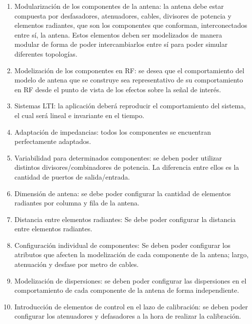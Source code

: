\begin{enumerate}
    \item Modularización de los componentes de la antena: la antena debe estar compuesta por desfasadores, atenuadores, cables,
		divisores de potencia y elementos radiantes, que son los componentes que conforman, interconectados entre sí, la antena. Estos
		elementos deben ser modelizados de manera modular de forma de poder intercambiarlos entre sí para poder simular diferentes
		topologías.

	\item Modelización de los componentes en RF: se desea que el comportamiento del modelo de antena que se construye sea 
		representativo de su comportamiento en RF desde el punto de vista de los efectos sobre la señal de interés.

    \item Sistemas LTI: la aplicación deberá reproducir el comportamiento del sistema, el cual será lineal e invariante
		en el tiempo.

	\item Adaptación de impedancias: todos los componentes se encuentran perfectamente adaptados.

    \item Variabilidad para determinados componentes: se deben poder utilizar distintos divisores/combinadores de potencia.
		La diferencia entre ellos es la cantidad de puertos de salida/entrada.

    \item Dimensión de antena: se debe poder configurar la cantidad de elementos radiantes por columna y fila de la antena.
    \item Distancia entre elementos radiantes: Se debe poder configurar la distancia entre elementos radiantes.

    \item Configuración individual de componentes: Se deben poder configurar los atributos que afecten la modelización de cada
		componente de la antena; largo, atenuación y desfase por metro de cables.

    \item Modelización de dispersiones: se deben poder configurar las dispersiones en el comportamiento de cada componente de la
		antena de forma independiente.

    \item Introducción de elementos de control en el lazo de calibración: se deben poder configurar los atenuadores y
		defasadores a la hora de realizar la calibración.


\end{enumerate}
